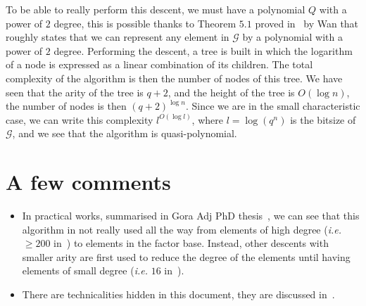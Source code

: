 \documentclass[a4paper,11pt]{article}
\theoremstyle{break}
\theoremstyle{sc}
\theoremstyle{definition}
\theoremstyle{remark}
\newcommand{\ie}{\emph{i.e. }}
\begin{document}
To be able to really perform this descent, we must have a polynomial $Q$ with a 
power of $2$ degree, this is possible thanks to Theorem $5.1$ proved 
in~\cite{Wan97} by Wan that roughly states that we can represent any element in
$\mathcal G$ by a polynomial with a power of $2$ degree. Performing the
descent, a tree is built in which the logarithm of a node is expressed
as a linear combination of its children. The total complexity of the algorithm
is then the number of nodes of this tree. We have seen that the arity of the
tree is $q+2$, and the height of the tree is $O(\log n)$, the number of nodes
is then $(q+2)^{\log n}$. Since we are in the small characteristic case, we
can write this complexity $l^{O(\log l)}$, where $l=\log(q^n)$ is the bitsize of
$\mathcal G$, and we see that the algorithm is quasi-polynomial.
\section{A few comments}

\begin{itemize}
  \item In practical works, summarised in Gora Adj PhD thesis~\cite{Adj16}, we
    can see that this algorithm in not really used all the way from elements
    of high degree (\ie $\geq 200$ in~\cite{Adj16}) to elements in the factor base. Instead, other descents
    with smaller arity are first used to reduce the degree of the elements
    until having elements of small degree (\ie $16$ in~\cite{Adj16}).
  \item There are technicalities hidden in this document, they are discussed
    in~\cite{GKZ14}.
\end{itemize}

\clearpage


\end{document}

